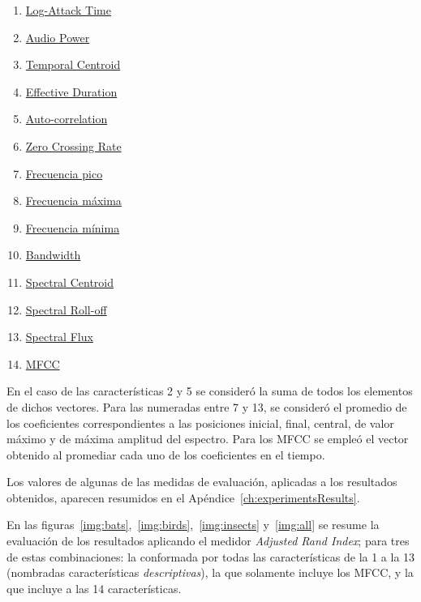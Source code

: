 \begin{multicols}{2}
    \begin{enumerate}
        \item \hyperref[subsec:log-attackTime]{Log-Attack Time}
        \item \hyperref[subsec:audioPower]{Audio Power}
        \item \hyperref[subsec:temporalCentroid]{Temporal Centroid}
        \item \hyperref[subsec:effectiveDuration]{Effective Duration}
        \item \hyperref[subsec:auto-correlation]{Auto-correlation}
        \item \hyperref[subsec:zeroCrossingRate]{Zero Crossing Rate}
        \item \hyperref[itemize:basic-spectral-features]{Frecuencia pico}
        \item \hyperref[itemize:basic-spectral-features]{Frecuencia máxima}
        \item \hyperref[itemize:basic-spectral-features]{Frecuencia mínima}
        \item \hyperref[itemize:basic-spectral-features]{Bandwidth}
        \item \hyperref[subsubsec:spectralCentroid]{Spectral Centroid}
        \item \hyperref[subsubsec:spectrallRollOff]{Spectral Roll-off}
        \item \hyperref[subsec:spectralFlux]{Spectral Flux}
        \item \hyperref[sec:MFCC]{MFCC}
    \end{enumerate}
\end{multicols}

En el caso de las características 2 y 5 se consideró la suma de todos los elementos de dichos vectores.
Para las numeradas entre 7 y 13, se consideró el promedio de los coeficientes correspondientes a las posiciones inicial, final, central, de valor máximo y de máxima amplitud del espectro.
Para los MFCC se empleó el vector obtenido al promediar cada uno de los coeficientes en el tiempo.

Los valores de algunas de las medidas de evaluación, aplicadas a los resultados obtenidos, aparecen resumidos en el Apéndice~\ref{ch:experimentsResults}.

En las figuras~\ref{img:bats},~\ref{img:birds},~\ref{img:insects} y~\ref{img:all} se resume la evaluación de los resultados aplicando el medidor \textit{Adjusted Rand Index};
para tres de estas combinaciones: la conformada por todas las características de la 1 a la 13 (nombradas características \textit{descriptivas}), la que solamente incluye los MFCC, y la que incluye a las 14 características.

